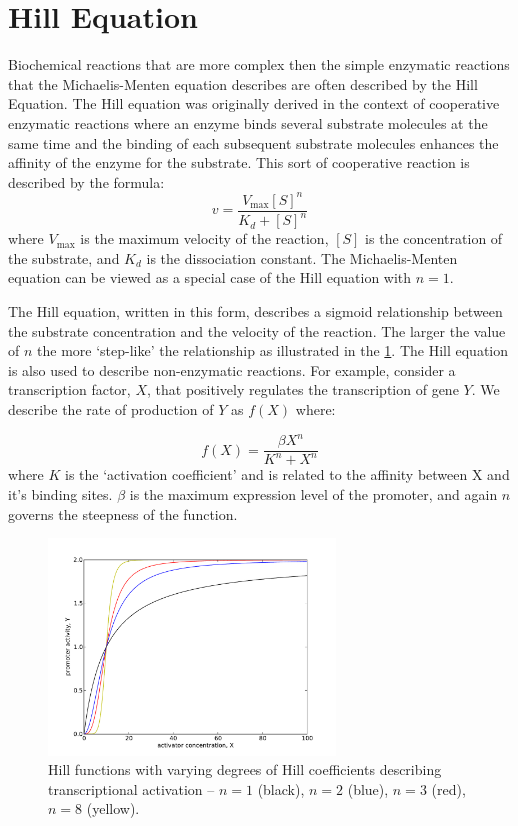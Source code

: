 \documentclass[11pt,letterpaper,oneside,pagesize]{scrartcl}
\begin{document}
\section{Hill Equation}

Biochemical reactions that are more complex then the simple enzymatic reactions that the Michaelis-Menten equation describes are often described by the Hill Equation.  The Hill equation was originally derived in the context of cooperative enzymatic reactions where an enzyme binds several substrate molecules at the same time and the binding of each subsequent substrate molecules enhances the affinity of the enzyme for the substrate. This sort of cooperative reaction is described by the formula:
%
\[
v = \frac{V_{\max}[S]^n}{K_d + [S]^n}
\]
%
where $V_{\max}$ is the maximum velocity of the reaction, $[S]$ is the concentration of the substrate, and $K_d$ is the dissociation constant. The Michaelis-Menten equation can be viewed as a special case of the Hill equation with $n=1$.

The Hill equation, written in this form, describes a sigmoid relationship between the substrate concentration and the velocity of the reaction. The larger the value of $n$ the more `step-like' the relationship as illustrated in the \cref{fig:hillcurves}. The Hill equation is also used to describe non-enzymatic reactions. For example, consider a transcription factor, $X$, that positively regulates the transcription of gene $Y$.  We describe the rate of production of $Y$ as $f(X)$ where:

\[
f(X) = \frac{\beta X^n}{K^n + X^n}
\]
where $K$ is the `activation coefficient' and is related to the affinity between X and it's binding sites. $\beta$ is the maximum expression level of the promoter, and again $n$ governs the steepness of the function.

\begin{figure}[lh]
\centering
 \includegraphics[width=3in]{hillcurves.pdf}
\caption{Hill functions with varying degrees of Hill coefficients describing transcriptional activation -- $n=1$ (black), $n=2$ (blue), $n=3$ (red), $n=8$ (yellow).}
\label{fig:hillcurves}
\end{figure}
\end{document}
